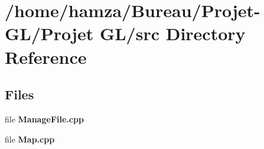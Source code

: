 \section{/home/hamza/\+Bureau/\+Projet-\/\+G\+L/\+Projet G\+L/src Directory Reference}
\label{dir_68267d1309a1af8e8297ef4c3efbcdba}
\subsection*{Files}
\begin{DoxyCompactItemize}
\item 
file {\bf Manage\+File.\+cpp}
\item 
file {\bf Map.\+cpp}
\end{DoxyCompactItemize}
